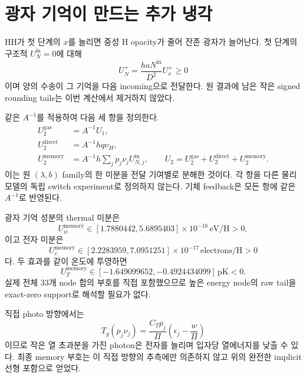 \documentclass[11pt,a4paper]{article}
\newcommand{\vu}{\nu_H}
\newcommand{\Np}{N^{\mathrm{in}}}
\begin{document}
\section{광자 기억이 만드는 추가 냉각}
HH가 첫 단계의 $x$를 늘리면 중성 H opacity가 줄어 잔존 광자가 늘어난다. 첫 단계의 구조적 $U_N^{\mathrm{in}}=0$에 대해
\begin{equation}
U_N^+=\frac{ha\Np}{D^2}U_x^+\ge0
\end{equation}
이며 양의 수송이 그 기억을 다음 incoming으로 전달한다. 원 결과에 남은 작은 signed rounding tails는 이번 계산에서 제거하지 않았다.

같은 $A^{-1}$를 적용하여 다음 세 항을 정의한다.
\begin{align}
U^{\mathrm{gas}}_2&=A^{-1}U_1,\\
U^{\mathrm{direct}}_2&=A^{-1}h q\vu,\\
U^{\mathrm{memory}}_2&=A^{-1}h\sum_j p_j\nu_jU_{N,j}^{\mathrm{in}},
\qquad U_2=U^{\mathrm{gas}}_2+U^{\mathrm{direct}}_2+U^{\mathrm{memory}}_2.
\end{align}
이는 원 $(\lambda,b)$ family의 한 미분을 전달 기여별로 분해한 것이다. 각 항을 다른 물리 모델의 독립 switch experiment로 정의하지 않는다. 기체 feedback은 모든 항에 같은 $A^{-1}$로 반영된다.


광자 기억 성분의 thermal 미분은
\begin{equation}
 U^{\mathrm{memory}}_w\in[1.7880442,5.6895403]\times10^{-18}\,\mathrm{eV/H}>0,
\end{equation}
이고 전자 미분은
\begin{equation}
 U^{\mathrm{memory}}_e\in[2.2283959,7.0951251]\times10^{-17}\,\mathrm{electrons/H}>0
\end{equation}
다. 두 효과를 같이 온도에 투영하면
\begin{equation}
 \boxed{U^{\mathrm{memory}}_T\in[-1.649099652,-0.4924434099]\,\mathrm{pK}<0.}
\end{equation}
실제 전체 33개 node 합의 부호를 직접 포함했으므로 높은 energy node의 raw tail을 exact-zero support로 해석할 필요가 없다.

직접 photo 방향에서는
\begin{equation}
T_g(p_j\nu_j)=\frac{C_Tp_j}{\Pi}\left(\epsilon_j-\frac{w}{\Pi}\right)
\end{equation}
이므로 작은 열 초과분을 가진 photon은 전자를 늘리며 입자당 열에너지를 낮출 수 있다. 최종 memory 부호는 이 직접 방향의 추측에만 의존하지 않고 위의 완전한 implicit 선형 포함으로 얻었다.\cite{theory,result,review}
\end{document}
